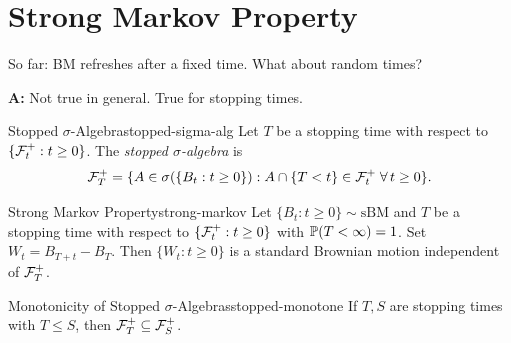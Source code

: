 \section{Strong Markov Property}

So far: BM refreshes after a fixed time. What about random times?

\noindent\textbf{A:} Not true in general. True for stopping times.

\begin{definition}{Stopped $\sigma$-Algebra}{stopped-sigma-alg}
    Let $T$ be a stopping time with respect to $\{\mathcal{F}_t^+ : t \geq 0\}$. The \emph{stopped $\sigma$-algebra} is
    \[
        \mathcal{F}_T^+ = \{A \in \sigma(\{B_t : t \geq 0\}) : A \cap \{T < t\} \in \mathcal{F}_t^+ \;\forall\, t \geq 0\}.
    \]
\end{definition}

\begin{theorem}{Strong Markov Property}{strong-markov}
    Let $\{B_t : t \geq 0\} \sim \mathrm{sBM}$ and $T$ be a stopping time with respect to $\{\mathcal{F}_t^+ : t \geq 0\}$ with $\mathbb{P}(T < \infty) = 1$. Set $W_t = B_{T+t} - B_T$. Then $\{W_t : t \geq 0\}$ is a standard Brownian motion independent of $\mathcal{F}_T^+$.
\end{theorem}

\begin{remark}{Monotonicity of Stopped $\sigma$-Algebras}{stopped-monotone}
    If $T, S$ are stopping times with $T \leq S$, then $\mathcal{F}_T^+ \subseteq \mathcal{F}_S^+$.
\end{remark}

